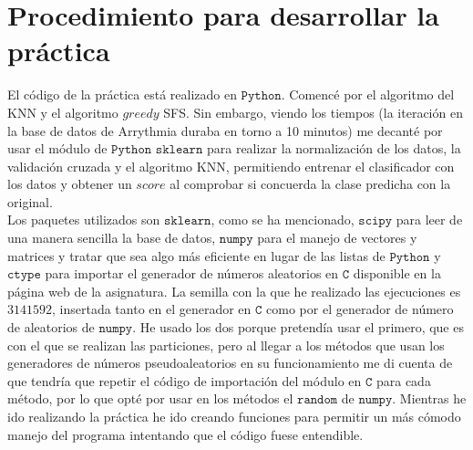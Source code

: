 \documentclass[11pt,leqno]{article}
\begin{document}
\section{Procedimiento para desarrollar la práctica}

El código de la práctica está realizado en $\texttt{Python}$. Comencé por el algoritmo del KNN y el algoritmo $\textit{greedy}$ SFS. Sin embargo, viendo los tiempos (la iteración en la base de datos de Arrythmia duraba en torno a 10 minutos) me decanté por usar el módulo de $\texttt{Python}$ $\texttt{sklearn}$ para realizar la normalización de los datos, la validación cruzada y el algoritmo KNN, permitiendo entrenar el clasificador con los datos y obtener un $\textit{score}$ al comprobar si concuerda la clase predicha con la original.\\

Los paquetes utilizados son $\texttt{sklearn}$, como se ha mencionado, $\texttt{scipy}$ para leer de una manera sencilla la base de datos, $\texttt{numpy}$ para el manejo de vectores y matrices y tratar que sea algo más eficiente en lugar de las listas de $\texttt{Python}$ y $\texttt{ctype}$ para importar el generador de números aleatorios en $\texttt{C}$ disponible en la página web de la asignatura. La semilla con la que he realizado las ejecuciones es $3141592$, insertada tanto en el generador en $\texttt{C}$ como por el generador de número de aleatorios de $\texttt{numpy}$. He usado los dos porque pretendía usar el primero, que es con el que se realizan las particiones, pero al llegar a los métodos que usan los generadores de números pseudoaleatorios en su funcionamiento me di cuenta de que tendría que repetir el código de importación del módulo en $\texttt{C}$ para cada método, por lo que opté por usar en los métodos el $\texttt{random}$ de $\texttt{numpy}$. Mientras he ido realizando la práctica he ido creando funciones para permitir un más cómodo manejo del programa intentando que el código fuese entendible.
\end{document}
